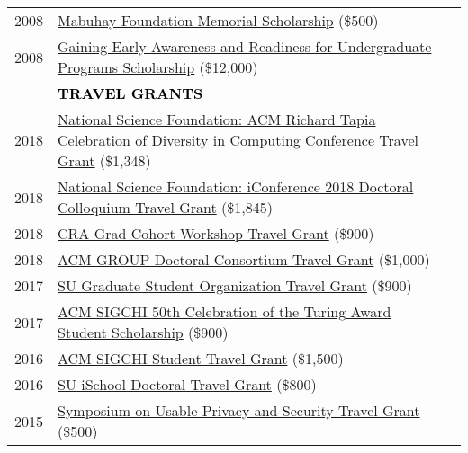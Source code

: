 \documentclass[11pt]{article}
\begin{document}
{{\begin{longtable}{Rp{0.75in}p{5.0in}}
\footnotesize{2008} & \href{https://www.facebook.com/MabuhayFoundationinYKMValley}{Mabuhay Foundation Memorial Scholarship} (\$500)\\

\footnotesize{2008} & \href{https://www2.ed.gov/programs/gearup/index.html}{Gaining Early Awareness and Readiness for Undergraduate Programs Scholarship} (\$12,000)\\

& \textcolor{black}{\uppercase{\textbf{Travel Grants}}}\\

\footnotesize{2018} & \href{https://www.nsf.gov/awardsearch/showAward?AWD_ID=1823052}{National Science Foundation: ACM Richard Tapia Celebration of Diversity in Computing Conference Travel Grant} (\$1,348)\\

\footnotesize{2018} & \href{https://www.nsf.gov/awardsearch/showAward?AWD_ID=1713738}{National Science Foundation: iConference 2018 Doctoral Colloquium Travel Grant} (\$1,845)\\

\footnotesize{2018} & \href{https://cra.org/events/urmgradcohort/}{CRA Grad Cohort Workshop Travel Grant} (\$900)\\

\footnotesize{2018} & \href{https://dl.acm.org/citation.cfm?id=3148330}{ACM GROUP Doctoral Consortium Travel Grant} (\$1,000)\\

\footnotesize{2017} & \href{http://gradorg.syr.edu/}{SU Graduate Student Organization Travel Grant} (\$900)\\

\footnotesize{2017} & \href{https://sigchi.org/2017/03/sigchi-sponsors-students-to-attend-turing-award-celebration/}{ACM SIGCHI 50th Celebration of the Turing Award Student Scholarship} (\$900)\\

\footnotesize{2016} & \href{https://sigchi.org/awards/gary-marsden-travel-awards/sigchi-student-travel-grant/}{ACM SIGCHI Student Travel Grant} (\$1,500)\\

\footnotesize{2016} & \href{https://ischool.syr.edu/research/grants-and-awards/}{SU iSchool Doctoral Travel Grant} (\$800)\\

\footnotesize{2015} & \href{https://cups.cs.cmu.edu/soups/2015/cfp.php}{Symposium on Usable Privacy and Security Travel Grant} (\$500)\\


\end{longtable}}}
\end{document}
